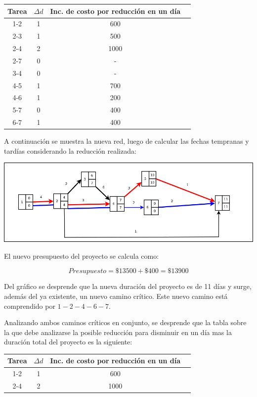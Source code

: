 \documentclass[a4paper,10pt]{article}
\begin{document}
   \begin{center}
   \begin{tabular}{|| c | c | c | c ||}
   \hline 
      Tarea & $\Delta d$ & Inc. de costo por reducci\'on en un d\'ia \\ \hline \hline
      1-2 & 1 & 600  \\ \hline
      2-3 & 1 & 500  \\ \hline 
      2-4 & 2 & 1000  \\ \hline
      2-7 & 0 & - \\ \hline
      3-4 & 0 & - \\ \hline
      4-5 & 1 & 700 \\ \hline
      4-6 & 1 & 200 \\ \hline
      5-7 & 0 & 400    \\ \hline
      6-7 & 1 & 400\\ \hline
   \end{tabular}
   \end{center}

A continuaci\'on se muestra la nueva red, luego de calcular las fechas tempranas y tard\'ias considerando la reducci\'on realizada:

  \begin{center}
    \includegraphics[scale=0.4,keepaspectratio=true]{img/ej5-1red.png} 
  \end{center}

El nuevo presupuesto del proyecto se calcula como:

$$ Presupuesto = \$13500 + \$400 = \$13900 $$

Del gr\'afico se desprende que la nueva duraci\'on del proyecto es de 11 d\'ias y surge, adem\'as del ya existente, un nuevo camino cr\'itico. Este nuevo camino est\'a
comprendido por $1-2-4-6-7$.

Analizando ambos caminos cr\'iticos en conjunto, se desprende que la tabla sobre la que debe analizarse la posible reducci\'on para disminuir en un d\'ia mas la duraci\'on total del proyecto es la siguiente:

   \begin{center}
   \begin{tabular}{|| c | c | c | c ||}
   \hline 
      Tarea & $\Delta d$ & Inc. de costo por reducci\'on en un d\'ia \\ \hline \hline
      1-2 & 1 & 600  \\ \hline
      2-4 & 2 & 1000  \\ \hline
   \end{tabular}
   \end{center}
\end{document}
